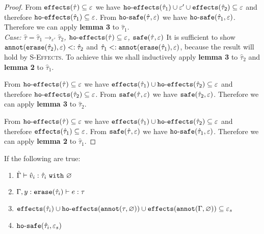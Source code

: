 \begin{appendix}
\begin{proof}
From $\mathtt{effects}(\hat \tau) \subseteq \varepsilon$ we have $\mathtt{ho \hbox{-} effects}(\hat \tau_1) \cup \varepsilon' \cup \mathtt{effects}(\hat \tau_2) \subseteq \varepsilon$ and therefore $\mathtt{ho \hbox{-} effects}(\hat \tau_1) \subseteq \varepsilon$. From $\mathtt{ho \hbox{-} safe}(\hat \tau, \varepsilon)$ we have $\mathtt{ho \hbox{-} safe}(\hat \tau_1, \varepsilon)$. Therefore we can apply \textbf{lemma 3} to $\hat \tau_1$.\\

\textit{Case: $\hat \tau = \hat \tau_1 \rightarrow_{\varepsilon'} \hat \tau_2$, $\mathtt{ho \hbox{-} effects}(\hat \tau) \subseteq \varepsilon$, $\mathtt{safe}(\hat \tau, \varepsilon)$ } It is sufficient to show $\mathtt{annot(erase}(\hat \tau_2), \varepsilon) <: \hat \tau_2$ and $\hat \tau_1 <: \mathtt{annot(erase}(\hat \tau_1), \varepsilon)$, because the result will hold by \textsc{S-Effects}. To achieve this we shall inductively apply \textbf{lemma 3} to $\hat \tau_2$ and \textbf{lemma 2} to $\hat \tau_1$.

From $\mathtt{ho \hbox{-} effects}(\hat \tau) \subseteq \varepsilon$ we have $\mathtt{effects}(\hat \tau_1) \cup \mathtt{ho \hbox{-} effects}(\hat \tau_2) \subseteq \varepsilon$ and therefore $\mathtt{ho \hbox{-} effects}(\hat \tau_2) \subseteq \varepsilon$. From $\mathtt{safe}(\hat \tau, \varepsilon)$ we have $\mathtt{safe}(\hat \tau_2, \varepsilon)$. Therefore we can apply \textbf{lemma 3} to $\hat \tau_2$.

From $\mathtt{ho \hbox{-} effects}(\hat \tau) \subseteq \varepsilon$ we have $\mathtt{effects}(\hat \tau_1) \cup \mathtt{ho \hbox{-} effects}(\hat \tau_2) \subseteq \varepsilon$ and therefore $\mathtt{effects}(\hat \tau_1) \subseteq \varepsilon$. From $\mathtt{safe}(\hat \tau, \varepsilon)$ we have $\mathtt{ho \hbox{-} safe}(\hat \tau_1, \varepsilon)$. Therefore we can apply \textbf{lemma 2} to $\hat \tau_1$.

\end{proof}

















\hrulefill

\begin{lemma}
If the following are true:

\begin{enumerate}
	\setlength\itemsep{-0.7em}
	\item $\hat \Gamma \vdash \hat v_i : \hat \tau_i~\mathtt{with}~ \varnothing$
	\item $\Gamma, y: \mathtt{erase}(\hat \tau_i) \vdash e: \tau$
	\item $\mathtt{effects}(\hat \tau_i) \cup \mathtt{ho \hbox{-} effects}(\mathtt{annot}(\tau, \varnothing)) \cup \mathtt{effects}(\mathtt{annot}(\Gamma, \varnothing)) \subseteq \varepsilon_{s}$
	\item $\mathtt{ho \hbox{-} safe}(\hat \tau_i, \varepsilon_s)$
\end{enumerate}


\end{lemma}
\end{appendix}
